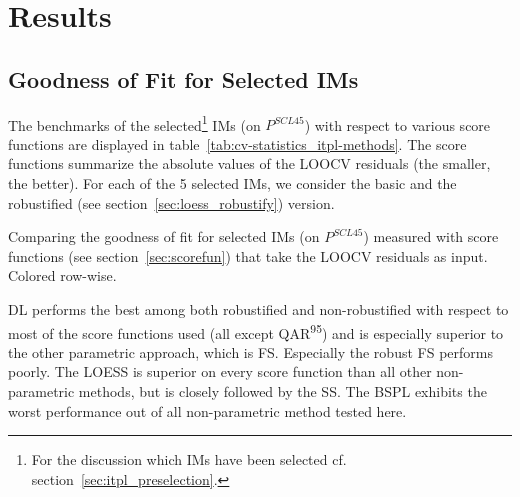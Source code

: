 \chapter{Results}\label{sec:results}

\section{Goodness of Fit for Selected {{IM}}s}{
	\label{sec:results_itpl}
	The benchmarks of the selected\footnote{\label{note:selected-IM} For the discussion which IMs have been selected cf. section~\ref{sec:itpl_preselection}.} {{IM}}s (on $P^{SCL45}$) with respect to various score functions are displayed in table~\ref{tab:cv-statistics_itpl-methods}. The score functions summarize the absolute values of the LOOCV residuals (the smaller, the better). For each of the 5 selected {{IM}}s, we consider the basic and the robustified (see section~\ref{sec:loess_robustify}) version.

	\begin{table}[h]
		\begin{center}
			\caption[Goodness of fit for {{IM}}s (on $P^{SCL45}$) measured with score functions.]{Comparing the goodness of fit for selected {{IM}}s (on $P^{SCL45}$) measured with score functions (see section~\ref{sec:scorefun}) that take the LOOCV residuals as input. Colored row-wise.}
			\scriptsize
			
			\normalsize
			\label{tab:cv-statistics_itpl-methods}
		\end{center}
	\end{table}
	
	DL performs the best among both robustified and non-robustified with respect to most of the score functions used (all except QAR\textsuperscript{95}) and is especially superior to the other parametric approach, which is FS. Especially the robust FS performs poorly. The LOESS is superior on every score function than all other non-parametric methods, but is closely followed by the SS. The BSPL exhibits the worst performance out of all non-parametric method tested here. 
}


